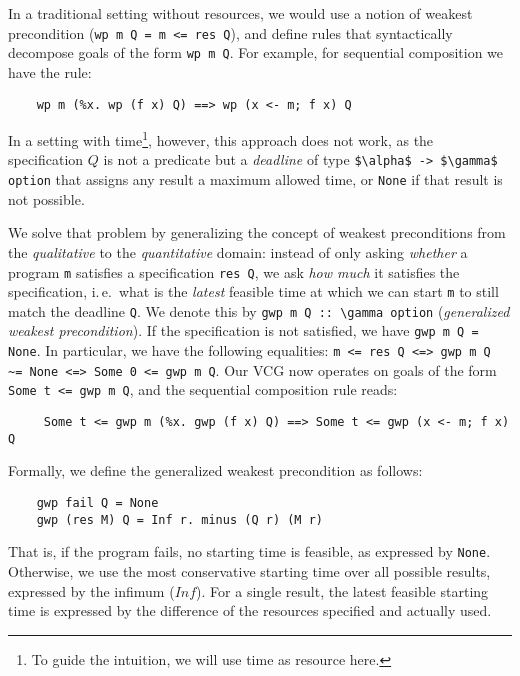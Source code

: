 \documentclass[acmsmall]{acmart}
\newcommand{\is}{\lstinline[language=isabelle]}
\newcommand{\ie}{i.\,e.\xspace}
\begin{document}
In a traditional setting without resources, we would use a notion of weakest precondition (\is$wp m Q = m <= res Q$), and define rules that syntactically decompose goals of the form \is$wp m Q$. 
For example, for sequential composition we have the rule:
\begin{lstlisting}
    wp m (%x. wp (f x) Q) ==> wp (x <- m; f x) Q
\end{lstlisting}
In a setting with time\footnote{To guide the intuition, we will use time as resource here.}, however, this approach does not work, as the specification $Q$ is not a predicate but a \emph{deadline} of type \is{$\alpha$ -> $\gamma$ option} that assigns any result a maximum allowed time, or \is{None} if that result is not possible.

We solve that problem by generalizing the concept of weakest preconditions from the \emph{qualitative} to the \emph{quantitative} domain:
instead of only asking \emph{whether} a program \is{m} satisfies a specification \is{res Q}, we ask \emph{how much} it satisfies the specification, \ie\ what is the \emph{latest} feasible time at which we can start \is{m} to still match the deadline \is{Q}.
We denote this by \is$gwp m Q :: \gamma option$ (\emph{generalized weakest precondition}).
If the specification is not satisfied, we have \is$gwp m Q = None$.
In particular, we have the following equalities: \is{m <= res Q <=> gwp m Q ~= None <=> Some 0 <= gwp m Q}.
%
Our VCG now operates on goals of the form \is{Some t <= gwp m Q}, and the sequential composition rule reads:
\begin{lstlisting}
     Some t <= gwp m (%x. gwp (f x) Q) ==> Some t <= gwp (x <- m; f x) Q
\end{lstlisting}
Formally, we define the generalized weakest precondition as follows:
\begin{lstlisting}
    gwp fail Q = None
    gwp (res M) Q = Inf r. minus (Q r) (M r)
\end{lstlisting}
That is, if the program fails, no starting time is feasible, as expressed by \is$None$. Otherwise, we use the most conservative starting time over all possible results, expressed by the infimum ($Inf$).
For a single result, the latest feasible starting time is expressed by the difference of the resources specified and actually used.
%
\end{document}
